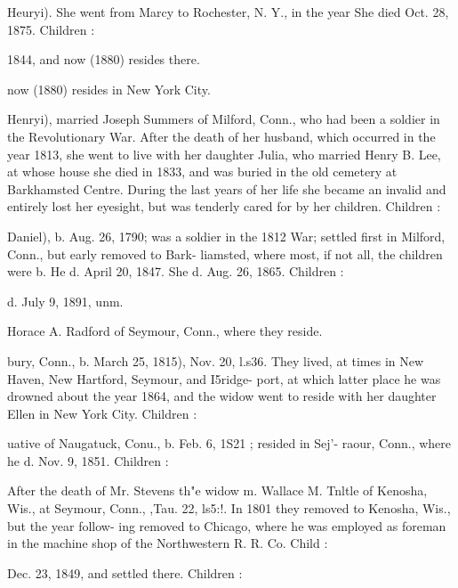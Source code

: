 \documentclass{book}
\begin{document}
Heuryi). She went from Marcy to Rochester, N. Y., in the year 
She died Oct. 28, 1875. Children : 


1844, and now (1880) resides there. 


now (1880) resides in New York City. 

Henryi), married Joseph Summers of Milford, Conn., who had 
been a soldier in the Revolutionary War. After the death of her 
husband, which occurred in the year 1813, she went to live with 
her daughter Julia, who married Henry B. Lee, at whose house she 
died in 1833, and was buried in the old cemetery at Barkhamsted 
Centre. During the last years of her life she became an invalid 
and entirely lost her eyesight, but was tenderly cared for by her 
children. Children : 




Daniel), b. Aug. 26, 1790; was a soldier in the 1812 War; 
settled first in Milford, Conn., but early removed to Bark- 
liamsted, where most, if not all, the children were b. He d. 
April 20, 1847. She d. Aug. 26, 1865. Children : 



d. July 9, 1891, unm. 




Horace A. Radford of Seymour, Conn., where they 
reside. 


bury, Conn., b. March 25, 1815), Nov. 20, l.s36. They lived, 
at times in New Haven, New Hartford, Seymour, and I5ridge- 
port, at which latter place he was drowned about the year 
1864, and the widow went to reside with her daughter Ellen 
in New York City. Children : 









uative of Naugatuck, Conu., b. Feb. 6, 1S21 ; resided in Sej'- 
raour, Conn., where he d. Nov. 9, 1851. Children : 




After the death of Mr. Stevens th"e widow m. Wallace M. 
Tnltle of Kenosha, Wis., at Seymour, Conn., ,Tau. 22, ls5:!. 
In 1801 they removed to Kenosha, Wis., but the year follow- 
ing removed to Chicago, where he was employed as foreman 
in the machine shop of the Northwestern R. R. Co. Child : 



Dec. 23, 1849, and settled there. Children : 
\end{document}
